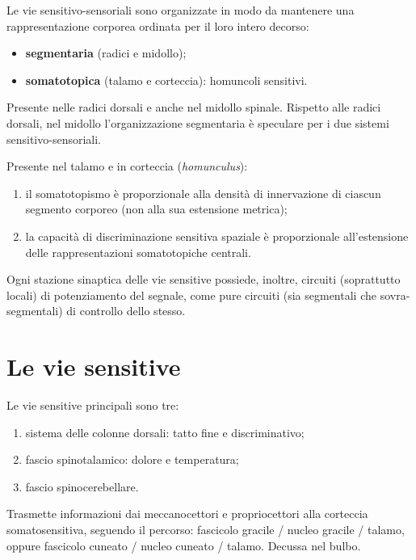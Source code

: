 Le vie sensitivo-sensoriali sono organizzate in modo da mantenere una
rappresentazione corporea ordinata per il loro intero decorso:
\begin{itemize}
  \item \textbf{segmentaria} (radici e midollo);
  \item \textbf{somatotopica} (talamo e corteccia): homuncoli sensitivi.
\end{itemize}

Presente nelle radici dorsali e anche nel midollo spinale. Rispetto alle
radici dorsali, nel midollo l'organizzazione segmentaria è speculare per i
due sistemi sensitivo-sensoriali.

Presente nel talamo e in corteccia (\textit{homunculus}):
\begin{enumerate}
  \item il somatotopismo è proporzionale alla densità di innervazione di
    ciascun segmento corporeo (non alla sua estensione metrica);
  \item la capacità di discriminazione sensitiva spaziale è proporzionale
    all'estensione delle rappresentazioni somatotopiche centrali.
\end{enumerate}

Ogni stazione sinaptica delle vie sensitive possiede, inoltre, circuiti
(soprattutto locali) di potenziamento del segnale, come pure circuiti (sia
segmentali che sovra-segmentali) di controllo dello stesso.

\section{Le vie sensitive}

Le vie sensitive principali sono tre:
\begin{enumerate}
  \item sistema delle colonne dorsali: tatto fine e discriminativo;
  \item fascio spinotalamico: dolore e temperatura;
  \item fascio spinocerebellare.
\end{enumerate}

Trasmette informazioni dai meccanocettori e propriocettori alla corteccia
somatosensitiva, seguendo il percorso: fascicolo gracile / nucleo gracile
/ talamo, oppure fascicolo cuneato / nucleo cuneato / talamo. Decussa nel
bulbo.

